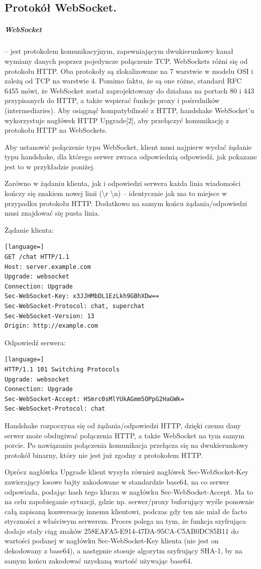 \documentclass[a4paper,12pt,oneside]{book}
\begin{document}
			\newpage\subsection{Protokół WebSocket.}
				\subparagraph{WebSocket} – jest protokołem komunikacyjnym, zapewniającym dwukierunkowy kanał wymiany danych poprzez pojedyncze połączenie TCP. WebSockets różni się od protokołu HTTP. Oba protokoły są zlokalizowane na 7 warstwie w modelu OSI i zależą od TCP na warstwie 4. Pomimo faktu, że są one różne, standard RFC 6455 mówi, że WebSocket został zaprojektowany do działana na portach 80 i 443 przypisanych do HTTP, a także wspierać funkcje proxy i pośredników (intermediaries). Aby osiągnąć kompatybilność z HTTP, handshake WebSocket’u wykorzystuje nagłówek HTTP Upgrade[2], aby przełączyć komunikację z protokołu HTTP na WebSockets.
				
				Aby ustanowić połączenie typu WebSocket, klient musi najpierw wysłać żądanie typu handshake, dla którego serwer zwraca odpowiednią odpowiedź, jak pokazane jest to w przykładzie poniżej.
				
				Zarówno w żądaniu klienta, jak i odpowiedzi serwera każda linia wiadomości kończy się znakiem nowej linii (\textbackslash r \textbackslash n) – identycznie jak ma to miejsce w przypadku protokołu HTTP. Dodatkowo na samym końcu żądania/odpowiedzi musi znajdować się pusta linia.
				
				Żądanie klienta:
				\begin{lstlisting}[language=]
GET /chat HTTP/1.1
Host: server.example.com
Upgrade: websocket
Connection: Upgrade
Sec-WebSocket-Key: x3JJHMbDL1EzLkh9GBhXDw==
Sec-WebSocket-Protocol: chat, superchat
Sec-WebSocket-Version: 13
Origin: http://example.com
				\end{lstlisting}
			
			Odpowiedź serwera:
			\begin{lstlisting}[language=]
HTTP/1.1 101 Switching Protocols
Upgrade: websocket
Connection: Upgrade
Sec-WebSocket-Accept: HSmrc0sMlYUkAGmm5OPpG2HaGWk=
Sec-WebSocket-Protocol: chat
			\end{lstlisting}
		
			Handshake rozpoczyna się od żądania/odpowiedzi HTTP, dzięki czemu dany serwer może obsługiwać połączenia HTTP, a także WebSocket na tym samym porcie. Po nawiązaniu połączenia komunikacja przełącza się na dwukierunkowy protokół binarny, który nie jest już zgodny z protokołem HTTP.
			
			Oprócz nagłówka Upgrade klient wysyła również nagłówek Sec-WebSocket-Key zawierający losowe bajty zakodowane w standardzie base64, na co serwer odpowiada, podając hash tego klucza w nagłówku Sec-WebSocket-Accept. Ma to na celu zapobieganie sytuacji, gdzie np. serwer/proxy buforujący wyśle ponownie całą zapisaną konwersację innemu klientowi, podczas gdy ten nie miał de facto styczności z właściwym serwerem. Proces polega na tym, że funkcja szyfrująca dodaje stały ciąg znaków 258EAFA5-E914-47DA-95CA-C5AB0DC85B11 do wartości podanej w nagłówku Sec-WebSocket-Key klienta (nie jest on dekodowany z base64), a następnie stosuje algorytm szyfrujący SHA-1, by na samym końcu zakodować uzyskaną wartość używając base64.
			
\end{document}
